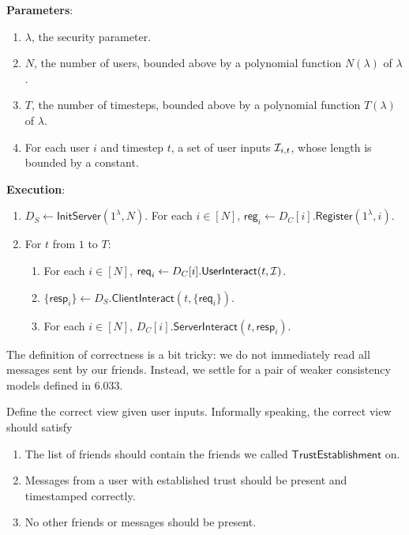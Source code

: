 \documentclass{article}
\newcommand{\reg}{\mathsf{reg}}
\newcommand{\req}{\mathsf{req}}
\newcommand{\resp}{\mathsf{resp}}
\begin{document}
\begin{definition}
\textbf{Parameters}: \begin{enumerate}
    \item $\lambda$, the security parameter.
    \item $N$, the number of users, bounded above by a polynomial function $N(\lambda)$ of $\lambda$.
    \item $T$, the number of timesteps, bounded above by a polynomial function $T(\lambda)$ of $\lambda$.
    \item For each user $i$ and timestep $t$, a set of user inputs $\mathcal I_{i, t}$, whose length is bounded by a constant.
\end{enumerate}
\textbf{Execution}:
\begin{enumerate}
\item $D_S\leftarrow \mathsf{InitServer}(1^{\lambda}, N)$. For each $i \in [N]$, $\reg_i \leftarrow D_C[i].\mathsf{Register}(1^{\lambda}, i)$. 
\item For $t$ from $1$ to $T$:
    \begin{enumerate}
    \item For each $i \in [N]$, $\req_i \leftarrow D_C[i].\mathsf{UserInteract}(t, \cI)$.
    
    \item $\{\resp_i\} \leftarrow D_S.\mathsf{ClientInteract}(t, \{\req_i\})$.
    
    \item For each $i \in [N]$, $D_C[i].\mathsf{ServerInteract}(t, \resp_i)$.
    \end{enumerate}
\end{enumerate}
\end{definition}
The definition of correctness is a bit tricky: we do not immediately read all messages sent by our friends. Instead, we settle for a pair of weaker consistency models defined in 6.033. %
\begin{definition}
Define the correct view given user inputs. Informally speaking, the correct view should satisfy
\begin{enumerate}
    \item The list of friends should contain the friends we called $\mathsf{TrustEstablishment}$ on.
    \item Messages from a user with established trust should be present and timestamped correctly.
    \item No other friends or messages should be present.
\end{enumerate}
\end{definition}
\end{document}

